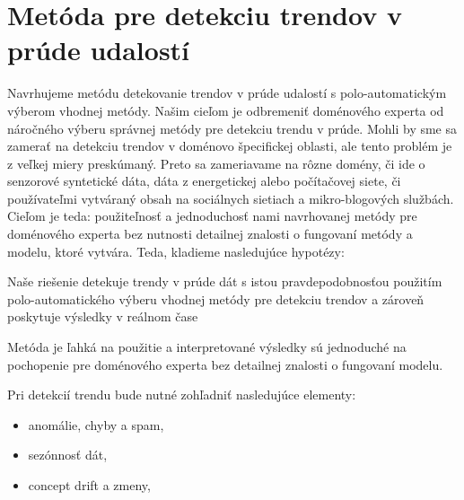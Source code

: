 \chapter{Metóda pre detekciu trendov v prúde udalostí}
\label{Metóda pre detekciu trendov v prúde udalostí}
Navrhujeme metódu detekovanie trendov v prúde udalostí s polo-automatickým výberom vhodnej metódy. Našim cieľom je odbremeniť doménového experta od náročného výberu správnej metódy pre detekciu trendu v prúde. Mohli by sme sa zamerať na detekciu trendov v doménovo špecifickej oblasti, ale tento problém je z veľkej miery preskúmaný. Preto sa zameriavame na rôzne domény, či ide o senzorové syntetické dáta, dáta z energetickej alebo počítačovej siete, či používateľmi vytváraný obsah na sociálnych sietiach a mikro-blogových službách. Cieľom je teda: použiteľnosť a jednoduchosť nami navrhovanej metódy pre doménového experta bez nutnosti detailnej znalosti o fungovaní metódy a modelu, ktoré vytvára.
Teda, kladieme nasledujúce hypotézy:
\begin{hypothesis}{Naše riešenie detekuje trendy v prúde dát s istou pravdepodobnosťou použitím polo-automatického výberu vhodnej metódy pre detekciu trendov a zároveň poskytuje výsledky v reálnom čase}
\end{hypothesis}
\begin{hypothesis}{Metóda je ľahká na použitie a interpretované výsledky sú jednoduché na pochopenie pre doménového experta bez detailnej znalosti o fungovaní modelu.}
\end{hypothesis}

Pri detekcií trendu bude nutné zohľadniť nasledujúce elementy:
\begin{itemize}
	\item anomálie, chyby a spam,
	\item sezónnosť dát,
	\item concept drift a zmeny,
\end{itemize}

